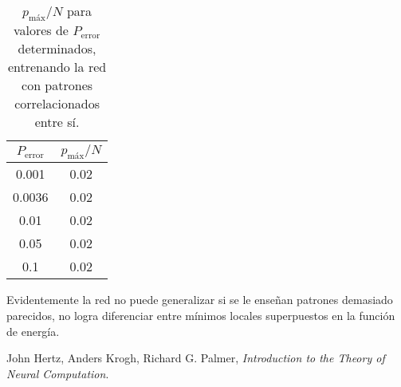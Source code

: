 \documentclass[a4paper,12pt]{article}
\begin{document}
\begin{table}[!h]
    \centering
    \begin{tabular}{|c|c|}
        \hline
        $P_{\text{error}}$ & $p_{\text{máx}} / N$ \\
        \hline
        0.001 & 0.02 \\
        \hline
        0.0036 & 0.02 \\
        \hline
        0.01 & 0.02 \\
        \hline
        0.05 & 0.02 \\
        \hline
        0.1 & 0.02 \\
        \hline
    \end{tabular}
    \caption{$p_{\text{máx}} / N$ para valores de $P_{\text{error}}$ determinados, entrenando la red con patrones correlacionados entre sí.}
    \label{tab:tabla2}
\end{table}

Evidentemente la red no puede generalizar si se le enseñan patrones demasiado parecidos, no logra diferenciar entre mínimos locales superpuestos en la función de energía.

\newpage
\begin{thebibliography}{9}

John Hertz, Anders Krogh, Richard G. Palmer, \textit{Introduction to the Theory of Neural Computation}.

\end{thebibliography}
\end{document}
